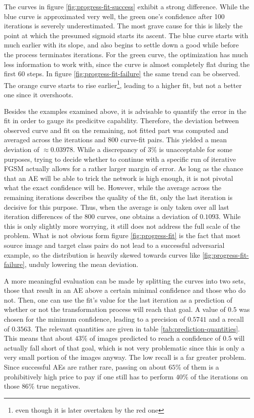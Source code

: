 \documentclass[11pt, a4paper]{article}
\begin{document}
The curves in figure \ref{fig:progress-fit-success} exhibit a strong difference. While the blue curve is approximated very well, the green one's confidence after 100 iterations is severely underestimated. The most grave cause for this is likely the point at which the presumed sigmoid starts its ascent. The blue curve starts with much earlier with its slope, and also begins to settle down a good while before the process terminates iterations. For the green curve, the optimization has much less information to work with, since the curve is almost completely flat during the first 60 steps. In figure \ref{fig:progress-fit-failure} the same trend can be observed. The orange curve starts to rise earlier\footnote{even though it is later overtaken by the red one}, leading to a higher fit, but not a better one since it overshoots.

Besides the examples examined above, it is advisable to quantify the error in the fit in order to gauge its predicitve capability. Therefore, the deviation between observed curve and fit on the remaining, not fitted part was computed and averaged across the iterations and 800 curve-fit pairs. This yielded a mean deviation of $\approx 0.03978$. While a discrepancy of $3\%$ is unacceptable for some purposes, trying to decide whether to continue with a specific run of iterative FGSM actually allows for a rather larger margin of error. As long as the chance that an AE will be able to trick the network is high enough, it is not pivotal what the exact confidence will be. However, while the average across the remaining iterations describes the quality of the fit, only the last iteration is decisive for this purpose. Thus, when the average is only taken over all last iteration differences of the 800 curves, one obtains a deviation of $0.1093$. While this is only slightly more worrying, it still does not address the full scale of the problem. What is not obvious form figure \ref{fig:progress-fit} is the fact that most source image and target class pairs do not lead to a successful adversarial example, so the distribution is heavily skewed towards curves like \ref{fig:progress-fit-failure}, unduly lowering the mean deviation.

A more meaningful evaluation can be made by splitting the curves into two sets, those that result in an AE above a certain minimal confidence and those who do not. Then, one can use the fit's value for the last iteration as a prediction of whether or not the transformation process will reach that goal. A value of $0.5$ was chosen for the minimum confidence, leading to a precision of $0.5741$ and a recall of $0.3563$. The relevant quantities are given in table \ref{tab:prediction-quantities}. This means that about $43\%$ of images predicted to reach a confidence of $0.5$ will actually fall short of that goal, which is not very problematic since this is only a very small portion of the images anyway. The low recall is a far greater problem. Since successful AEs are rather rare, passing on about $65\%$ of them is a prohibitively high price to pay if one still has to perform $40\%$ of the iterations on those $86\%$ true negatives.
\end{document}
